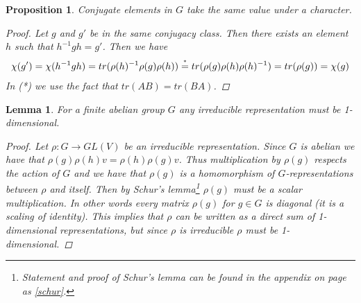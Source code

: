 \documentclass[11pt, a4paper, english]{article}
\newtheorem{prop}{Proposition}
\numberwithin{prop}{section}
\newtheorem{lemma}{Lemma}
\numberwithin{lemma}{section}
\numberwithin{theorem}{section}
\numberwithin{defin}{section}
\numberwithin{example}{section}
\begin{document}
\begin{prop}
Conjugate elements in $G$ take the same value under a character.
\begin{proof}
Let $g$ and $g'$ be in the same conjugacy class. Then there exists an element $h$ such that $h^{-1}gh=g'$. Then we have
\begin{equation*}
\begin{split}
\chi(g')=\chi(h^{-1}gh) = tr(\rho(h)^{-1}\rho(g)\rho(h)) \stackrel{\mathclap{\normalfont\mbox{\tiny{*}}}}{=} tr(\rho(g)\rho(h)\rho(h)^{-1}) = tr(\rho(g))=\chi(g)
\end{split}
\end{equation*}
In (*) we use the fact that $tr(AB)=tr(BA)$.
\end{proof}
\end{prop}

\begin{lemma}
For a finite abelian group $G$ any irreducible representation must be 1-dimensional.
\begin{proof}
Let $\rho: G \to GL(V)$ be an irreducible representation. Since $G$ is abelian we have that $\rho(g)\rho(h)v = \rho(h)\rho(g)v$. Thus multiplication by $\rho(g)$ respects the action of $G$ and we have that $\rho(g)$ is a homomorphism of $G$-representations between $\rho$ and itself. Then by Schur's lemma\footnote{Statement and proof of Schur's lemma can be found in the appendix on page \pageref{schur} as \cref{schur}.} $\rho(g)$ must be a scalar multiplication. In other words every matrix $\rho(g)$ for $g \in G$ is diagonal (it is a scaling of identity). This implies that $\rho$ can be written as a direct sum of 1-dimensional representations, but since $\rho$ is irreducible $\rho$ must be 1-dimensional.
\end{proof}
\end{lemma}
\end{document}
